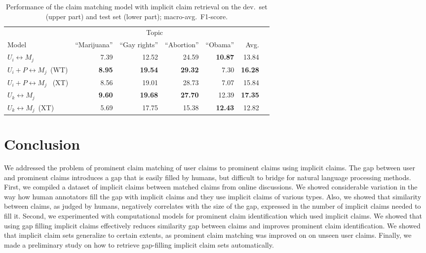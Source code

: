 \begin{table}
\begin{center}
{\small
\setlength{\tabcolsep}{4.8pt}
\begin{tabular}{lrrrrrr}
\toprule
&\multicolumn{4}{c}{Topic}\\
\cmidrule(lr){2-5}
Model & ``Marijuana'' & ``Gay rights''  & ``Abortion'' & ``Obama'' & Avg. \\
\midrule
$U_i \leftrightarrow M_j$ & 7.39          & 12.52        & 24.59       & {\bf 10.87} & 13.84 \\
$U_i + P \leftrightarrow M_j$\ (WT)     & {\bf 8.95}    & {\bf 19.54}  & {\bf 29.32} & 7.30        & {\bf 16.28} \\
$U_i + P \leftrightarrow M_j$ \ (XT)   & 8.56          & 19.01        & 28.73       & 7.07        & 15.84 \\
\midrule
$U_k \leftrightarrow M_j$            & {\bf 9.60}   & {\bf 19.68}   & {\bf 27.70} & 12.39       & {\bf 17.35} \\
$U_k \leftrightarrow M_j$\ (XT)  & 5.69         &  17.75        & 15.38       & {\bf 12.43} & 12.82 \\
\bottomrule
\end{tabular}}
\caption{Performance of the claim matching model with implicit claim retrieval on the
dev.~set (upper part) and test set (lower part); macro-avg.~F1-score.}
\label{tab:argpremise_retrieval}
\end{center}
\end{table}

\section{Conclusion}

We addressed the problem of prominent claim matching of user claims to prominent claims
using implicit claims.
The gap between user and prominent claims introduces a gap that is 
easily filled by humans, but difficult to bridge for natural language processing 
methods. 
First, we compiled a dataset of implicit claims between matched claims from 
online discussions.
We showed considerable variation in the way how human annotators fill the gap
with implicit claims and they use implicit claims of various types. 
Also, we showed that similarity between claims, as judged by humans, negatively
correlates with the size of the gap, 
expressed in the number of implicit claims needed to fill it. 
Second, we experimented with computational models for prominent claim identification 
which used implicit claims. 
We showed that using gap filling implicit claims effectively reduces similarity gap between claims 
and improves prominent claim identification. 
We showed that implicit claim sets generalize to certain extents, as prominent claim matching was
improved on  on unseen user claims. 
Finally, we made a preliminary study on how to retrieve gap-filling implicit
claim sets automatically.

